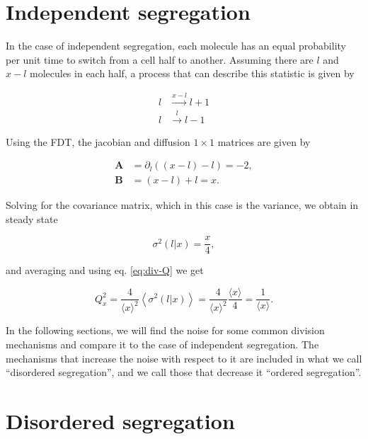 \section{Independent segregation}

In the case of independent segregation, each molecule has an equal probability per unit time to switch from a cell half to another. Assuming there are $l$ and $x-l$ molecules in each half, a process that can describe this statistic is given by

\begin{equation}
  \label{eq:div-arr_ind}
  \begin{split}
    l&\xrightarrow{x-l}l+1\\
    l&\xrightarrow{l}l-1
  \end{split}
\end{equation}

Using the FDT, the jacobian and diffusion $1\times1$ matrices are given by

\begin{equation}
  \begin{split}
    \mathbf{A} &= \partial_l\left((x-l)-l\right) = -2,\\
    \mathbf{B} &= (x-l)+l = x.
  \end{split}
\end{equation}

Solving for the covariance matrix, which in this case is the variance, we obtain in steady state

\begin{equation}
  \label{eq:div-var_ind}
  \sigma^2(l|x) = \frac{x}{4},
\end{equation}

and averaging and using eq. \eqref{eq:div-Q} we get

\begin{equation}
  Q_x^2 = \frac{4}{\langle x\rangle^2}\left\langle\sigma^2(l|x)\right\rangle = \frac{4}{\langle x\rangle^2}\frac{\langle x\rangle}{4} = \frac{1}{\langle x\rangle}.
\end{equation}

In the following sections, we will find the noise for some common division mechanisms and compare it to the case of independent segregation. The mechanisms that increase the noise with respect to it are included in what we call ``disordered segregation'', and we call those that decrease it ``ordered segregation''.

\section{Disordered segregation}

